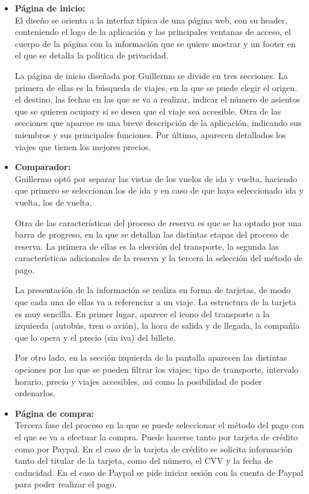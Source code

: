 \begin{itemize}
    \item\textbf{Página de inicio:} \\ El diseño se orienta a la interfaz típica de una página web, con su header, conteniendo el logo de la aplicación y las principales ventanas de acceso, el cuerpo de la página con la información que se quiere mostrar y un footer en el que se detalla la política de privacidad.
    
    La página de inicio diseñada por Guillermo se divide en tres secciones. La primera de ellas es la búsqueda de viajes, en la que se puede elegir el origen. el destino, las fechas en las que se va a realizar, indicar el número de asientos que se quieren ocupary si se desea que el viaje sea accesible.
    Otra de las secciones que aparece es una breve descripción de la aplicación, indicando sus miembros y sus principales funciones.
    Por último, aparecen detallados los viajes que tienen los mejores precios.

    \item\textbf{Comparador:} \\ Guillermo optó por separar las vistas de los vuelos de ida y vuelta, haciendo que primero se seleccionan los de ida y en caso de que haya seleccionado ida y vuelta, los de vuelta. 
    
    Otra de las características del proceso de reserva es que se ha optado por una barra de progreso, en la que se detallan las distintas etapas del proceso de reserva. La primera de ellas es la elección del transporte, la segunda las características adicionales de la reserva y la tercera la selección del método de pago.

    La presentación de la información se realiza en forma de tarjetas, de modo que cada una de ellas va a referenciar a un viaje. La estructura de la tarjeta es muy sencilla. En primer lugar, aparece el icono del transporte a la izquierda (autobús, tren o avión), la hora de salida y de llegada, la compañía que lo opera y el precio (sin iva) del billete.

    Por otro lado, en la sección izquierda de la pantalla aparecen las distintas opciones por las que se pueden filtrar los viajes: tipo de transporte, intervalo horario, precio y viajes accesibles, así como la posibilidad de poder ordenarlos.
    \item\textbf{Página de compra:} \\ Tercera fase del proceso en la que se puede seleccionar el método del pago con el que se va a efectuar la compra. Puede hacerse tanto por tarjeta de crédito como por Paypal.
    En el caso de la tarjeta de crédito se solicita información tanto del titular de la tarjeta, como del número, el CVV y la fecha de caducidad.
    En el caso de Paypal se pide iniciar sesión con la cuenta de Paypal para poder realizar el pago.


\end{itemize}
